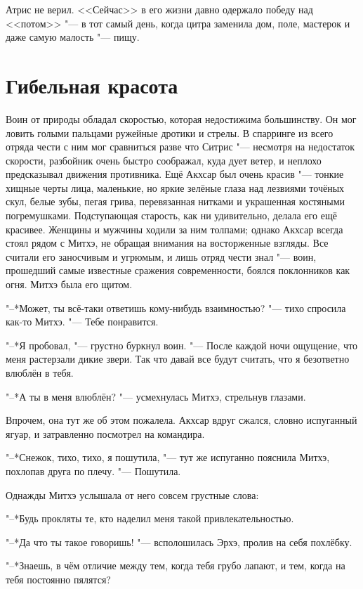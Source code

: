 \documentclass[a4paper,10pt]{book}
\begin{document}
Атрис не верил. <<Сейчас>> в его жизни давно одержало победу над <<потом>> "--- в тот самый день, когда цитра заменила дом, поле, мастерок и даже самую малость "--- пищу.

\section{Гибельная красота}

Воин от природы обладал скоростью, которая недостижима большинству. Он мог ловить голыми пальцами ружейные дротики и стрелы. В спарринге из всего отряда чести с ним мог сравниться разве что Ситрис "--- несмотря на недостаток скорости, разбойник очень быстро соображал, куда дует ветер, и неплохо предсказывал движения противника. Ещё Акхсар был очень красив "--- тонкие хищные черты лица, маленькие, но яркие зелёные глаза над лезвиями точёных скул, белые зубы, пегая грива, перевязанная нитками и украшенная костяными погремушками. Подступающая старость, как ни удивительно, делала его ещё красивее. Женщины и мужчины ходили за ним толпами; однако Акхсар всегда стоял рядом с Митхэ, не обращая внимания на восторженные взгляды. Все считали его заносчивым и угрюмым, и лишь отряд чести знал "--- воин, прошедший самые известные сражения современности, боялся поклонников как огня. Митхэ была его щитом.

"--*Может, ты всё-таки ответишь кому-нибудь взаимностью? "--- тихо спросила как-то Митхэ. "--- Тебе понравится.

"--*Я пробовал, "--- грустно буркнул воин. "--- После каждой ночи ощущение, что меня растерзали дикие звери. Так что давай все будут считать, что я безответно влюблён в тебя.

"--*А ты в меня влюблён? "--- усмехнулась Митхэ, стрельнув глазами.

Впрочем, она тут же об этом пожалела. Акхсар вдруг сжался, словно испуганный ягуар, и затравленно посмотрел на командира.

"--*Снежок, тихо, тихо, я пошутила, "--- тут же испуганно пояснила Митхэ, похлопав друга по плечу. "--- Пошутила. 

Однажды Митхэ услышала от него совсем грустные слова:

"--*Будь прокляты те, кто наделил меня такой привлекательностью.

"--*Да что ты такое говоришь! "--- всполошилась Эрхэ, пролив на себя похлёбку.

"--*Знаешь, в чём отличие между тем, когда тебя грубо лапают, и тем, когда на тебя постоянно пялятся?
\end{document}
